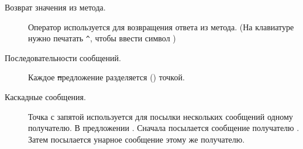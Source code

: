 \documentclass[a4paper,10pt,twoside]{book}
\begin{document}
\begin{description}

\item[Возврат значения из метода.] Оператор \ct{^} используется для возвращения ответа из метода.
	(На клавиатуре нужно печатать \verb|^|, чтобы ввести символ \ct{^})


\item[Последовательности сообщений.]	Каждое \st предложение разделяется () точкой.	


\item[Каскадные сообщения.] Точка с запятой используется для посылки нескольких сообщений одному получателю.
	В предложении .
	Сначала посылается сообщение  получателю .
	Затем посылается унарное сообщение  этому же получателю.

\end{description}
\end{document}
